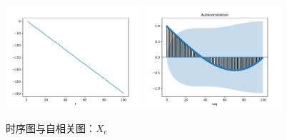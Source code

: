 \documentclass[cn]{homework}
\begin{document}
\begin{subproblem}
        \item
        \begin{figure}[h]
            \centering
            \includegraphics[width=0.45\textwidth]{Xe.pdf}
            \includegraphics[width=0.45\textwidth]{Xe-acf.pdf}
            \caption{时序图与自相关图：$X_e$}
        \end{figure}
    \end{subproblem}

    \newpage
\end{document}
